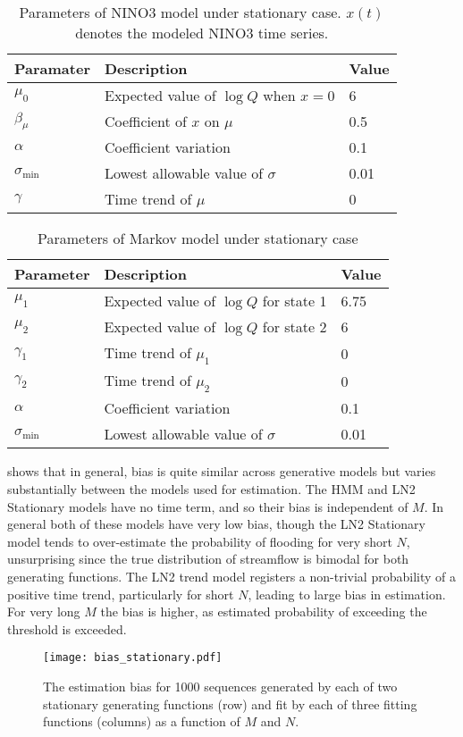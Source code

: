\documentclass[12pt]{article}
\begin{document}
\begin{table}[ht]
  \begin{tabular}{L{1in}L{3.75in}L{0.75in}}
    \toprule
    Paramater & Description & Value \\
    \midrule
    $\mu_0$ & Expected value of $\log Q$ when $x=0$ & 6 \\
    $\beta_\mu$ & Coefficient of $x$ on $\mu$ & 0.5 \\
    $\alpha$ & Coefficient variation & 0.1 \\
    $\sigma_\text{min}$ & Lowest allowable value of $\sigma$ & 0.01 \\
    $\gamma$ & Time trend of $\mu$ & 0 \\
    \bottomrule
  \end{tabular}
  \caption{Parameters of NINO3 model under stationary case. $x(t)$ denotes the modeled NINO3 time series.}\label{tab:nino-stationary}
\end{table}
\begin{table}[ht]
  \begin{tabular}{L{1in}L{3.75in}L{0.75in}}
    \toprule
    Parameter & Description & Value \\
    \midrule
    $\mu_1$ & Expected value of $\log Q$ for state 1 & 6.75 \\
    $\mu_2$ & Expected value of $\log Q$ for state 2 & 6 \\
    $\gamma_1$ & Time trend of $\mu_1$ & 0 \\
    $\gamma_2$ & Time trend of $\mu_2$ & 0 \\
    $\alpha$ & Coefficient variation & 0.1 \\
    $\sigma_\text{min}$ & Lowest allowable value of $\sigma$ & 0.01 \\
    \bottomrule
  \end{tabular}
  \caption{Parameters of Markov model under stationary case}\label{tab:markov-stationary}
\end{table}


 shows that in general, bias is quite similar across generative models but varies substantially between the models used for estimation.
The HMM and LN2 Stationary models have no time term, and so their bias is independent of \(M\).
In general both of these models have very low bias, though the LN2 Stationary model tends to over-estimate the probability of flooding for very short \(N\), unsurprising since the true distribution of streamflow is bimodal for both generating functions. 
The LN2 trend model registers a non-trivial probability of a positive time trend, particularly for short \(N\), leading to large bias in estimation.
For very long \(M\) the bias is higher, as estimated probability of exceeding the threshold is exceeded.
\begin{figure}[ht]
  \texttt{[image: bias\_stationary.pdf]}
  \caption{The estimation bias for 1000 sequences generated by each of two stationary generating functions (row) and fit by each of three fitting functions (columns) as a function of \(M\) and \(N\).\label{fig:stationary-bias}}
\end{figure}
\end{document}
